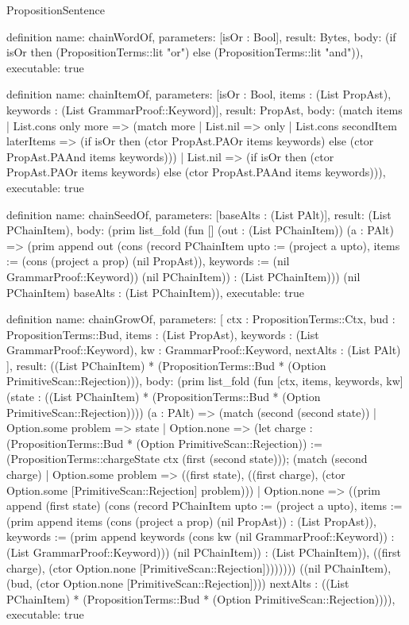 \begin{lexlean}{PropositionSentence}
\begin{semanticmodule}
definition{
  name: chainWordOf,
  parameters: [isOr : Bool],
  result: Bytes,
  body: (if isOr then (PropositionTerms::lit "or") else (PropositionTerms::lit "and")),
  executable: true
}

definition{
  name: chainItemOf,
  parameters: [isOr : Bool, items : (List PropAst), keywords : (List GrammarProof::Keyword)],
  result: PropAst,
  body: (match items
    | List.cons only more => (match more
        | List.nil => only
        | List.cons secondItem laterItems => (if isOr then (ctor PropAst.PAOr items keywords) else (ctor PropAst.PAAnd items keywords)))
    | List.nil => (if isOr then (ctor PropAst.PAOr items keywords) else (ctor PropAst.PAAnd items keywords))),
  executable: true
}

definition{
  name: chainSeedOf,
  parameters: [baseAlts : (List PAlt)],
  result: (List PChainItem),
  body: (prim list_fold (fun [] (out : (List PChainItem)) (a : PAlt) => (prim append out (cons (record PChainItem {upto := (project a upto), items := (cons (project a prop) (nil PropAst)), keywords := (nil GrammarProof::Keyword)}) (nil PChainItem)) : (List PChainItem))) (nil PChainItem) baseAlts : (List PChainItem)),
  executable: true
}

definition{
  name: chainGrowOf,
  parameters: [
    ctx : PropositionTerms::Ctx,
    bud : PropositionTerms::Bud,
    items : (List PropAst),
    keywords : (List GrammarProof::Keyword),
    kw : GrammarProof::Keyword,
    nextAlts : (List PAlt)
  ],
  result: ((List PChainItem) * (PropositionTerms::Bud * (Option PrimitiveScan::Rejection))),
  body: (prim list_fold (fun [ctx, items, keywords, kw] (state : ((List PChainItem) * (PropositionTerms::Bud * (Option PrimitiveScan::Rejection)))) (a : PAlt) => (match (second (second state))
    | Option.some problem => state
    | Option.none => (let charge : (PropositionTerms::Bud * (Option PrimitiveScan::Rejection)) := (PropositionTerms::chargeState ctx (first (second state))); (match (second charge)
        | Option.some problem => ((first state), ((first charge), (ctor Option.some [PrimitiveScan::Rejection] problem)))
        | Option.none => ((prim append (first state) (cons (record PChainItem {upto := (project a upto), items := (prim append items (cons (project a prop) (nil PropAst)) : (List PropAst)), keywords := (prim append keywords (cons kw (nil GrammarProof::Keyword)) : (List GrammarProof::Keyword))}) (nil PChainItem)) : (List PChainItem)), ((first charge), (ctor Option.none [PrimitiveScan::Rejection]))))))) ((nil PChainItem), (bud, (ctor Option.none [PrimitiveScan::Rejection]))) nextAlts : ((List PChainItem) * (PropositionTerms::Bud * (Option PrimitiveScan::Rejection)))),
  executable: true
}


\end{semanticmodule}
\end{lexlean}
